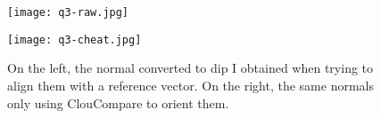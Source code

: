 \documentclass[french]{article}
\begin{document}
\begin{figure}[h]
	\centering
	\begin{minipage}{0.49\linewidth}
		\texttt{[image: q3-raw.jpg]}
	\end{minipage}\hfill
	\begin{minipage}{0.49\linewidth}
		\texttt{[image: q3-cheat.jpg]}
	\end{minipage}
	\caption{On the left, the normal converted to dip I obtained when trying to align them with a reference vector. On the right, the same normals only using ClouCompare to orient them.}
	\label{fig:q3}
\end{figure}
\end{document}
